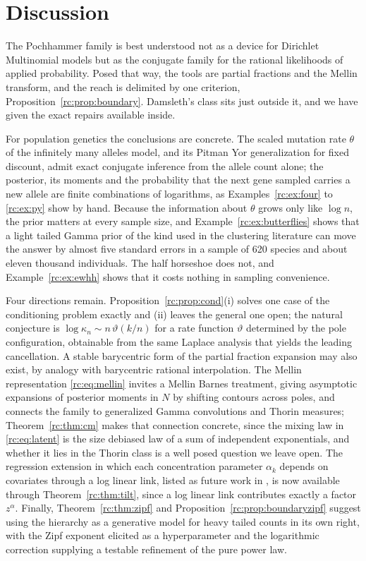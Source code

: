 \section{Discussion}\label{rc:sec:discussion}

The Pochhammer family is best understood not as a device for Dirichlet Multinomial models but as the conjugate family for the rational likelihoods of applied probability. Posed that way, the tools are partial fractions and the Mellin transform, and the reach is delimited by one criterion, Proposition~\ref{rc:prop:boundary}. Damsleth's class sits just outside it, and we have given the exact repairs available inside.

For population genetics the conclusions are concrete. The scaled mutation rate $\theta$ of the infinitely many alleles model, and its Pitman Yor generalization for fixed discount, admit exact conjugate inference from the allele count alone; the posterior, its moments and the probability that the next gene sampled carries a new allele are finite combinations of logarithms, as Examples~\ref{rc:ex:four} to \ref{rc:ex:py} show by hand. Because the information about $\theta$ grows only like $\log n$, the prior matters at every sample size, and Example~\ref{rc:ex:butterflies} shows that a light tailed Gamma prior of the kind used in the clustering literature can move the answer by almost five standard errors in a sample of 620 species and about eleven thousand individuals. The half horseshoe does not, and Example~\ref{rc:ex:ewhh} shows that it costs nothing in sampling convenience.

Four directions remain. Proposition~\ref{rc:prop:cond}(i) solves one case of the conditioning problem exactly and (ii) leaves the general one open; the natural conjecture is $\log\kappa_n\sim n\,\vartheta(k/n)$ for a rate function $\vartheta$ determined by the pole configuration, obtainable from the same Laplace analysis that yields the leading cancellation. A stable barycentric form of the partial fraction expansion may also exist, by analogy with barycentric rational interpolation. The Mellin representation \eqref{rc:eq:mellin} invites a Mellin Barnes treatment, giving asymptotic expansions of posterior moments in $N$ by shifting contours across poles, and connects the family to generalized Gamma convolutions and Thorin measures; Theorem~\ref{rc:thm:cm} makes that connection concrete, since the mixing law in \eqref{rc:eq:latent} is the size debiased law of a sum of independent exponentials, and whether it lies in the Thorin class is a well posed question we leave open. The regression extension in which each concentration parameter $\alpha_k$ depends on covariates through a log linear link, listed as future work in \citet{rc:wang2024}, is now available through Theorem~\ref{rc:thm:tilt}, since a log linear link contributes exactly a factor $z^\alpha$. Finally, Theorem~\ref{rc:thm:zipf} and Proposition~\ref{rc:prop:boundaryzipf} suggest using the hierarchy as a generative model for heavy tailed counts in its own right, with the Zipf exponent elicited as a hyperparameter and the logarithmic correction supplying a testable refinement of the pure power law.

